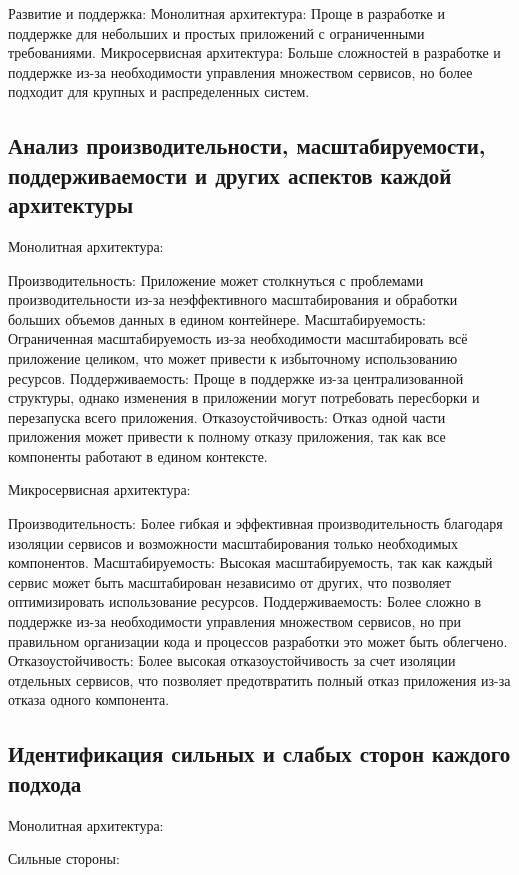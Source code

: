     Развитие и поддержка:
        Монолитная архитектура: Проще в разработке и поддержке для небольших и простых приложений с ограниченными требованиями.
        Микросервисная архитектура: Больше сложностей в разработке и поддержке из-за необходимости управления множеством сервисов, но более подходит для крупных и распределенных систем.

\subsection{Анализ производительности, масштабируемости, поддерживаемости и других аспектов каждой архитектуры}
    Монолитная архитектура:
    
        Производительность: Приложение может столкнуться с проблемами производительности из-за неэффективного масштабирования и обработки больших объемов данных в едином контейнере.
        Масштабируемость: Ограниченная масштабируемость из-за необходимости масштабировать всё приложение целиком, что может привести к избыточному использованию ресурсов.
        Поддерживаемость: Проще в поддержке из-за централизованной структуры, однако изменения в приложении могут потребовать пересборки и перезапуска всего приложения.
        Отказоустойчивость: Отказ одной части приложения может привести к полному отказу приложения, так как все компоненты работают в едином контексте.
    
    Микросервисная архитектура:
    
        Производительность: Более гибкая и эффективная производительность благодаря изоляции сервисов и возможности масштабирования только необходимых компонентов.
        Масштабируемость: Высокая масштабируемость, так как каждый сервис может быть масштабирован независимо от других, что позволяет оптимизировать использование ресурсов.
        Поддерживаемость: Более сложно в поддержке из-за необходимости управления множеством сервисов, но при правильном организации кода и процессов разработки это может быть облегчено.
        Отказоустойчивость: Более высокая отказоустойчивость за счет изоляции отдельных сервисов, что позволяет предотвратить полный отказ приложения из-за отказа одного компонента.

\subsection{Идентификация сильных и слабых сторон каждого подхода}
    Монолитная архитектура:

    Сильные стороны:
    
